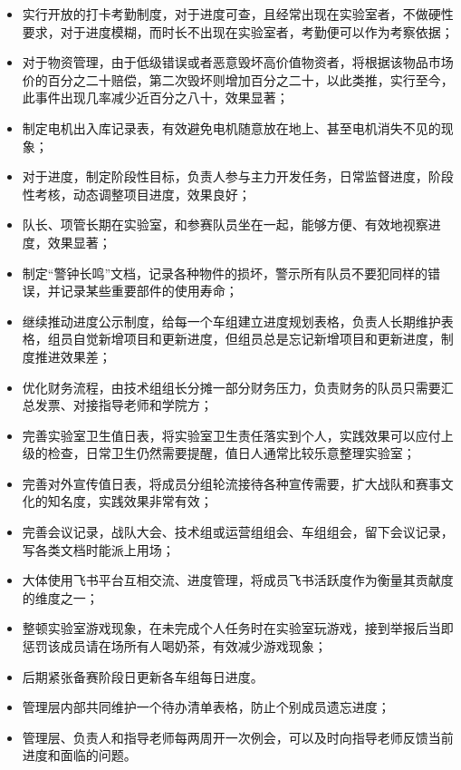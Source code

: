         \begin{itemize}
            \item 实行开放的打卡考勤制度，对于进度可查，且经常出现在实验室者，不做硬性要求，对于进度模糊，而时长不出现在实验室者，考勤便可以作为考察依据；
            \item 对于物资管理，由于低级错误或者恶意毁坏高价值物资者，将根据该物品市场价的百分之二十赔偿，第二次毁坏则增加百分之二十，以此类推，实行至今，此事件出现几率减少近百分之八十，效果显著；
            \item 制定电机出入库记录表，有效避免电机随意放在地上、甚至电机消失不见的现象；
            \item 对于进度，制定阶段性目标，负责人参与主力开发任务，日常监督进度，阶段性考核，动态调整项目进度，效果良好；
            \item 队长、项管长期在实验室，和参赛队员坐在一起，能够方便、有效地视察进度，效果显著；
            \item 制定“警钟长鸣”文档，记录各种物件的损坏，警示所有队员不要犯同样的错误，并记录某些重要部件的使用寿命；
            \item 继续推动进度公示制度，给每一个车组建立进度规划表格，负责人长期维护表格，组员自觉新增项目和更新进度，但组员总是忘记新增项目和更新进度，制度推进效果差；
            \item 优化财务流程，由技术组组长分摊一部分财务压力，负责财务的队员只需要汇总发票、对接指导老师和学院方；
            \item 完善实验室卫生值日表，将实验室卫生责任落实到个人，实践效果可以应付上级的检查，日常卫生仍然需要提醒，值日人通常比较乐意整理实验室；
            \item 完善对外宣传值日表，将成员分组轮流接待各种宣传需要，扩大战队和赛事文化的知名度，实践效果非常有效；
            \item 完善会议记录，战队大会、技术组或运营组组会、车组组会，留下会议记录，写各类文档时能派上用场；
            \item 大体使用飞书平台互相交流、进度管理，将成员飞书活跃度作为衡量其贡献度的维度之一；
            \item 整顿实验室游戏现象，在未完成个人任务时在实验室玩游戏，接到举报后当即惩罚该成员请在场所有人喝奶茶，有效减少游戏现象；
            \item 后期紧张备赛阶段日更新各车组每日进度。
            \item 管理层内部共同维护一个待办清单表格，防止个别成员遗忘进度；
            \item 管理层、负责人和指导老师每两周开一次例会，可以及时向指导老师反馈当前进度和面临的问题。
        \end{itemize}

